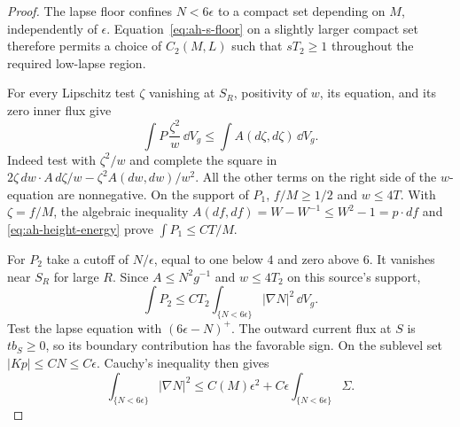 \begin{proof}
The lapse floor confines \(N<6\epsilon\) to a compact set
depending on \(M\), independently of \(\epsilon\).
Equation~\eqref{eq:ah-s-floor} on a slightly larger compact set
therefore permits a choice of \(C_2(M,L)\) such that
\(sT_2\ge1\) throughout the required low-lapse region.

For every Lipschitz test \(\zeta\) vanishing at \(S_R\), positivity
of \(w\), its equation, and its zero inner flux give
\begin{equation}\label{eq:ah-penalty-test}
 \int P\,\frac{\zeta^2}{w}\,\dd V_g
       \le \int A(d\zeta,d\zeta)\,\dd V_g .
\end{equation}
Indeed test with \(\zeta^2/w\) and complete the square in
\(2\zeta\,dw\cdot A\,d\zeta/w-\zeta^2 A(dw,dw)/w^2\).
All the other terms on the right side of the \(w\)-equation
are nonnegative.  On the support of \(P_1\),
\(f/M\ge1/2\) and \(w\le4T\).  With \(\zeta=f/M\),
the algebraic inequality
\(A(df,df)=W-W^{-1}\le W^2-1=p\cdot df\) and
\eqref{eq:ah-height-energy} prove
\(\int P_1\le CT/M\).

For \(P_2\) take a cutoff of \(N/\epsilon\), equal to one
below \(4\) and zero above \(6\).  It vanishes near \(S_R\)
for large \(R\).  Since \(A\le N^2g^{-1}\) and \(w\le4T_2\)
on this source's support,
\begin{equation}\label{eq:ah-low-lapse-cost}
 \int P_2\le
 C T_2\int_{\{N<6\epsilon\}}|\nabla N|^2\,\dd V_g.
\end{equation}
Test the lapse equation with \((6\epsilon-N)^+\).
The outward current flux at \(S\) is \(t b_S\ge0\), so its
boundary contribution has the favorable sign.  On the
sublevel set \(|Kp|\le CN\le C\epsilon\).  Cauchy's inequality
then gives
\begin{equation}\label{eq:ah-low-lapse-energy}
 \int_{\{N<6\epsilon\}}|\nabla N|^2
 \le C(M)\epsilon^2
       +C\epsilon\int_{\{N<6\epsilon\}}\Sigma .
\end{equation}


\end{proof}
